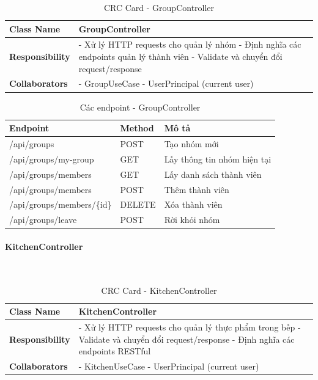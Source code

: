\begin{table}[H]
\small
\renewcommand{\arraystretch}{1.3}
\begin{tabularx}{\textwidth}{|>{\raggedright\arraybackslash}p{3.5cm}|X|}
\hline
\rowcolor{gray!20}
\textbf{Class Name} & GroupController \\
\hline
\textbf{Responsibility} & - Xử lý HTTP requests cho quản lý nhóm \newline - Định nghĩa các endpoints quản lý thành viên \newline - Validate và chuyển đổi request/response \\
\hline
\textbf{Collaborators} & - GroupUseCase \newline - UserPrincipal (current user) \\
\hline
\end{tabularx}
\caption{CRC Card - GroupController}
\end{table}

\begin{table}[H]
\small
\renewcommand{\arraystretch}{1.3}
\begin{tabularx}{\textwidth}{|>{\raggedright\arraybackslash}p{4.5cm}|>{\raggedright\arraybackslash}p{2cm}|X|}
\hline
\rowcolor{gray!20}
\textbf{Endpoint} & \textbf{Method} & \textbf{Mô tả} \\
\hline
/api/groups & POST & Tạo nhóm mới \\
\hline
/api/groups/my-group & GET & Lấy thông tin nhóm hiện tại \\
\hline
/api/groups/members & GET & Lấy danh sách thành viên \\
\hline
/api/groups/members & POST & Thêm thành viên \\
\hline
/api/groups/members/\{id\} & DELETE & Xóa thành viên \\
\hline
/api/groups/leave & POST & Rời khỏi nhóm \\
\hline
\end{tabularx}
\caption{Các endpoint - GroupController}
\end{table}

\paragraph{KitchenController} ~\\

\begin{table}[H]
\small
\renewcommand{\arraystretch}{1.3}
\begin{tabularx}{\textwidth}{|>{\raggedright\arraybackslash}p{3.5cm}|X|}
\hline
\rowcolor{gray!20}
\textbf{Class Name} & KitchenController \\
\hline
\textbf{Responsibility} & - Xử lý HTTP requests cho quản lý thực phẩm trong bếp \newline - Validate và chuyển đổi request/response \newline - Định nghĩa các endpoints RESTful \\
\hline
\textbf{Collaborators} & - KitchenUseCase \newline - UserPrincipal (current user) \\
\hline
\end{tabularx}
\caption{CRC Card - KitchenController}
\end{table}

